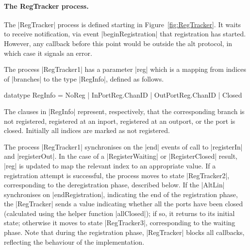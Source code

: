 


\paragraph{The {\scalashape RegTracker} process.}

The |RegTracker| process is defined starting in Figure~\ref{fig:RegTracker}.
It waits to receive notification, via event |beginRegistration| that
registration has started.  However, any callback before this point would be
outside the alt protocol, in which case it signals an error.

The process |RegTracker1| has a parameter |reg| which is a mapping from
indices of |branches| to the type |RegInfo|, defined as follows.
%
\begin{cspm}
  datatype RegInfo = NoReg | InPortReg.ChanID | OutPortReg.ChanID | Closed
\end{cspm}
%
The clauses in |RegInfo| represent, respectively, that the corresponding
branch is not registered, registered at an inport, registered at an outport,
or the port is closed.  Initially all indices are marked as not registered.

The process |RegTracker1| synchronises on the |end| events of call to
|registerIn| and |registerOut|.  In the case of a |RegisterWaiting| or
|RegisterClosed| result, |reg| is updated to map the relevant index to an
appropriate value.
%
If a registration attempt is successful, the process moves to state
|RegTracker2|, corresponding to the deregistration phase, described below.  If
the |AltLin| synchronises on |endRegistration|, indicating the end of the
registration phase, the |RegTracker| sends a value indicating whether all the
ports have been closed (calculated using the helper function |allClosed|); if
so, it returns to its initial state; otherwise it moves to state
|RegTracker3|, corresponding to the waiting phase.
%
Note that during the registration phase, |RegTracker| blocks all callbacks,
reflecting the behaviour of the implementation. 

